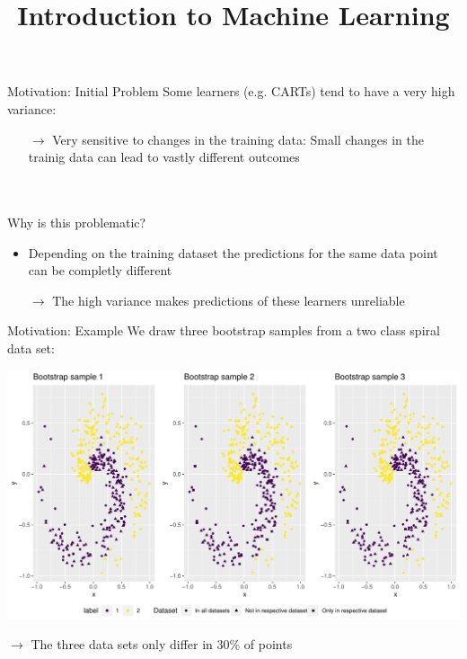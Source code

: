 \documentclass[11pt,compress,t,notes=noshow, xcolor=table]{beamer}
\title{Introduction to Machine Learning}
\institute{\href{https://compstat-lmu.github.io/lecture_i2ml/}{compstat-lmu.github.io/lecture\_i2ml}}
\date{}
\begin{document}
\sloppy

\begin{vbframe}{Motivation: Initial Problem}
Some learners (e.g. CARTs) tend to have a very high variance:
\begin{itemize}
  \item[$\rightarrow$] Very sensitive to changes in the training data:
  Small changes in the trainig data can lead to vastly different outcomes
\end{itemize}
\ \\
\ \\
Why is this problematic?
\begin{itemize}
  \item Depending on the training dataset the predictions for the same
  data point can  be completly different
  \item[$\rightarrow$] The high variance makes predictions of these learners unreliable
\end{itemize}
\end{vbframe}

\begin{vbframe}{Motivation: Example}
We draw three bootstrap samples from a two class spiral data set:
\begin{center}
\includegraphics[height=0.60\textheight, keepaspectratio]{figure/cart_forest_overview_bs_datasets.pdf}
\end{center}
$\rightarrow$ The three data sets only differ in 30\% of points
\end{vbframe}
\end{document}
